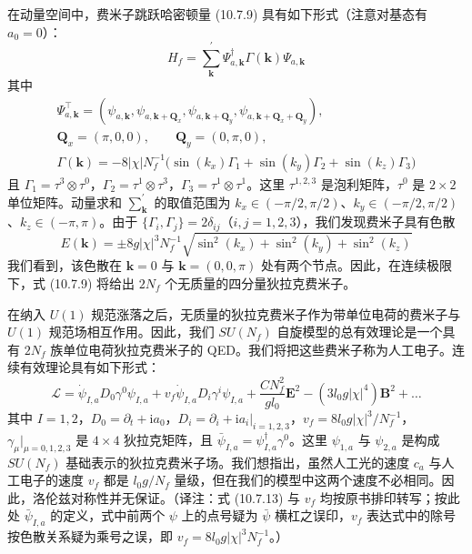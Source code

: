 在动量空间中，费米子跳跃哈密顿量 (10.7.9) 具有如下形式（注意对基态有 $a_0=0$）：
\begin{equation*}
H_f=\sum_{\pmb k}^{\prime}\Psi^{\dagger}_{a,\pmb k}\Gamma(\pmb k)\Psi_{a,\pmb k}
\end{equation*}
其中
\begin{gather*}
\Psi^{\top}_{a,\pmb k}=(\psi_{a,\pmb k},\psi_{a,\pmb k+\pmb Q_x},\psi_{a,\pmb k+\pmb Q_y},\psi_{a,\pmb k+\pmb Q_x+\pmb Q_y}),\\
\pmb Q_x=(\pi,0,0),\qquad \pmb Q_y=(0,\pi,0),\\
\Gamma(\pmb k)=-8|\chi|N_f^{-1}\big(\sin(k_x)\Gamma_1+\sin(k_y)\Gamma_2+\sin(k_z)\Gamma_3\big)\tag{10.7.12}
\end{gather*}
且 $\Gamma_1=\tau^{3}\otimes\tau^{0}$，$\Gamma_2=\tau^{1}\otimes\tau^{3}$，$\Gamma_3=\tau^{1}\otimes\tau^{1}$。这里 $\tau^{1,2,3}$ 是泡利矩阵，$\tau^{0}$ 是 $2\times2$ 单位矩阵。动量求和 $\sum_{\pmb k}^{\prime}$ 的取值范围为 $k_x\in(-\pi/2,\pi/2)$、$k_y\in(-\pi/2,\pi/2)$、$k_z\in(-\pi,\pi)$。由于 $\{\Gamma_i,\Gamma_j\}=2\delta_{ij}$（$i,j=1,2,3$），我们发现费米子具有色散
\begin{equation*}
E(\pmb k)=\pm8g|\chi|^{3}N_f^{-1}\sqrt{\sin^{2}(k_x)+\sin^{2}(k_y)+\sin^{2}(k_z)}
\end{equation*}
我们看到，该色散在 $\pmb k=0$ 与 $\pmb k=(0,0,\pi)$ 处有两个节点。因此，在连续极限下，式 (10.7.9) 将给出 $2N_f$ 个无质量的四分量狄拉克费米子。

在纳入 $U(1)$ 规范涨落之后，无质量的狄拉克费米子作为带单位电荷的费米子与 $U(1)$ 规范场相互作用。因此，我们 $SU(N_f)$ 自旋模型的总有效理论是一个具有 $2N_f$ 族单位电荷狄拉克费米子的 QED。我们将把这些费米子称为人工电子。连续有效理论具有如下形式：
\begin{equation*}
\mathcal L=\dot\psi_{I,a}D_0\gamma^{0}\psi_{I,a}+v_f\dot\psi_{I,a}D_i\gamma^{i}\psi_{I,a}+\frac{CN_f^{2}}{gl_0}\pmb E^{2}-(3l_0g|\chi|^{4})\pmb B^{2}+\dots\tag{10.7.13}
\end{equation*}
其中 $I=1,2$，$D_0=\partial_t+\mathrm{i}a_0$，$D_i=\partial_i+\mathrm{i}a_i|_{i=1,2,3}$，$v_f=8l_0g|\chi|^{3}/N_f^{-1}$，$\gamma_\mu|_{\mu=0,1,2,3}$ 是 $4\times4$ 狄拉克矩阵，且 $\bar\psi_{I,a}=\psi^{\dagger}_{I,a}\gamma^{0}$。这里 $\psi_{1,a}$ 与 $\psi_{2,a}$ 是构成 $SU(N_f)$ 基础表示的狄拉克费米子场。我们想指出，虽然人工光的速度 $c_a$ 与人工电子的速度 $v_f$ 都是 $l_0g/N_f$ 量级，但在我们的模型中这两个速度不必相同。因此，洛伦兹对称性并无保证。（译注：式 (10.7.13) 与 $v_f$ 均按原书排印转写；按此处 $\bar\psi_{I,a}$ 的定义，式中前两个 $\psi$ 上的点号疑为 $\bar\psi$ 横杠之误印，$v_f$ 表达式中的除号按色散关系疑为乘号之误，即 $v_f=8l_0g|\chi|^{3}N_f^{-1}$。）

